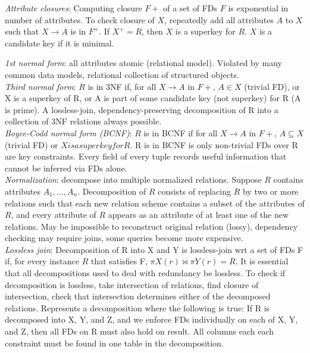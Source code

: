 \documentclass[10pt,landscape]{article}
\begin{document}
\begin{multicols}{3}
\textit{Attribute closures}: Computing closure $F+$ of a set of FDs $F$ is exponential in number of attributes. To check closure of $X$, repeatedly add all attributes $A$ to $X$ such that $X \rightarrow A$ is in $F^+$. If $X^+ = R$, then $X$ is a superkey for $R$. $X$ is a candidate key if it is minimal.

\textit{1st normal form}: all attributes atomic (relational model). Violated by many common data models, relational collection of structured objects. \\
\textit{Third normal form}: $R$ is in 3NF if, for all $X \rightarrow A$ in $F+$, $A \in X$ (trivial FD), or X is a superkey of R, or A is part of some candidate key (not superkey) for R (A is prime). A lossless-join, dependency-preserving decomposition of R into a collection of 3NF relations always possible. \\
\textit{Boyce-Codd normal form (BCNF)}: $R$ is in BCNF if for all $X \rightarrow A$ in $F+$, $A \subseteq X$ (trivial FD) or $X is a superkey for R$. R is in BCNF is only non-trivial FDs over R are key constraints. Every field of every tuple records useful information that cannot be inferred via FDs alone. \\
\textit{Normalization}: decompose into multiple normalized relations. Suppose $R$ contains attributes $A_1, \ldots, A_n$. Decomposition of $R$ consists of replacing $R$ by two or more relations such that each new relation scheme contains a subset of the attributes of $R$, and every attribute of $R$ appears as an attribute of at least one of the new relations. May be impossible to reconstruct original relation (lossy), dependency checking may require joins, some queries become more expensive. \\
\textit{Lossless join}: Decomposition of R into X and Y is lossless-join wrt a set of FDs F if, for every instance $R$ that satisfies F, $\pi X(r) \bowtie \pi Y(r) = R$. It is essential that all decompositions used to deal with redundancy be lossless. To check if decomposition is lossless, take intersection of relations, find closure of intersection, check that intersection determines either of the decomposed relations. Represents a decomposition where the following is true: If R is decomposed into X, Y, and Z, and we enforce FDs individually on each of X, Y, and Z, then all FDs on R must also hold on result. All columns each each constraint must be found in one table in the decomposition.
\end{multicols}
\end{document}

